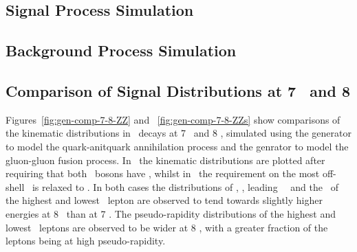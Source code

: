 \subsection{Signal Process Simulation}

\subsection{Background Process Simulation}

\subsection{Comparison of Signal Distributions at 7 \tev\ and 8 \tev}

Figures~\ref{fig:gen-comp-7-8-ZZ} and ~\ref{fig:gen-comp-7-8-ZZs} show comparisons of the kinematic distributions in \ZZllll\
decays at 7 \tev\ and 8 \tev, simulated using the \powhegbox\cite{Melia:2011tj} generator
to model the quark-anitquark annihilation process and the \ggtwoZZ\cite{gg2ZZ} genrator to
model the gluon-gluon fusion process. 
In~ the kinematic
distributions are plotted after requiring that both \Z\ bosons have \sstooos,
whilst in~\fig{gen-comp-7-8-ZZs} the requirement on the most off-shell \Z\ is
relaxed to \mZgtt. In both cases the distributions of \mZZ, \ptZZ, leading \Z\
\pt\ and the \pt\ of the highest and lowest \pt\ lepton are observed to tend towards
slightly higher energies at 8 \tev\ than at 7 \tev. The pseudo-rapidity
distributions of the highest and lowest \pt\ leptons are observed to be wider at
8 \tev, with a greater fraction of the leptons being at high pseudo-rapidity.

